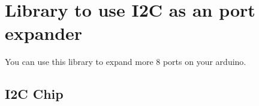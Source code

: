 \section*{Library to use I2C as an port expander}

You can use this library to expand more 8 ports on your arduino.

\subsection*{I2C Chip}

 